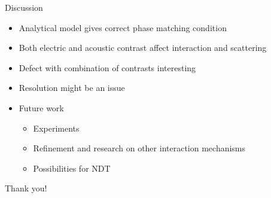 \documentclass[11pt, final]{beamer}
\begin{document}
	\begin{frame}{Discussion}
		\begin{itemize}
			\item Analytical model gives correct phase matching condition
			\pause
			\item Both electric and acoustic contrast affect interaction and scattering
			\pause
			\item Defect with combination of contrasts interesting
			\pause
			\item Resolution might be an issue
			\pause
			\item Future work
			\begin{itemize}
				\item Experiments
				\item Refinement and research on other interaction mechanisms
				\item Possibilities for NDT
			\end{itemize}
		\end{itemize}
	\end{frame}
	
	\begin{frame}
		\centering \huge
		Thank you!
	\end{frame}
\end{document}
